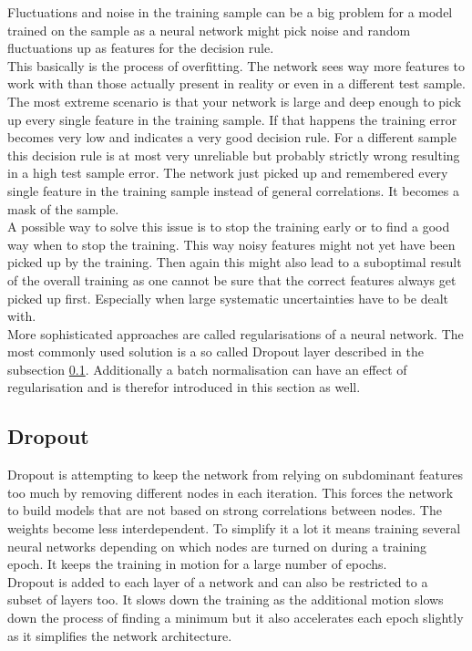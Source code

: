 Fluctuations and noise in the training sample can be a big problem for a model trained on the sample as a neural network might pick noise and random fluctuations up as features for the decision rule.\\
This basically is the process of overfitting. The network sees way more features to work with than those actually present in reality or even in a different test sample. The most extreme scenario is that your network is large and deep enough to pick up every single feature in the training sample. If that happens the training error becomes very low and indicates a very good decision rule. For a different sample this decision rule is at most very unreliable but probably strictly wrong resulting in a high test sample error. The network just picked up and remembered every single feature in the training sample instead of general correlations. It becomes a mask of the sample.\\
A possible way to solve this issue is to stop the training early or to find a good way when to stop the training. This way noisy features might not yet have been picked up by the training. Then again this might also lead to a suboptimal result of the overall training as one cannot be sure that the correct features always get picked up first. Especially when large systematic uncertainties have to be dealt with.\\
More sophisticated approaches are called regularisations of a neural network. The most commonly used solution is a so called Dropout layer described in the subsection \ref{sec:dropout}. Additionally a batch normalisation can have an effect of regularisation and is therefor introduced in this section as well.

\subsection{Dropout}
\label{sec:dropout}

Dropout is attempting to keep the network from relying on subdominant features too much by removing different nodes in each iteration. This forces the network to build models that are not based on strong correlations between nodes. The weights become less interdependent. To simplify it a lot it means training several neural networks depending on which nodes are turned on during a training epoch. It keeps the training in motion for a large number of epochs.\\
Dropout is added to each layer of a network and can also be  restricted to a subset of layers too. It slows down the training as the additional motion slows down the process of finding a minimum but it also accelerates each epoch slightly as it simplifies the network architecture. 

